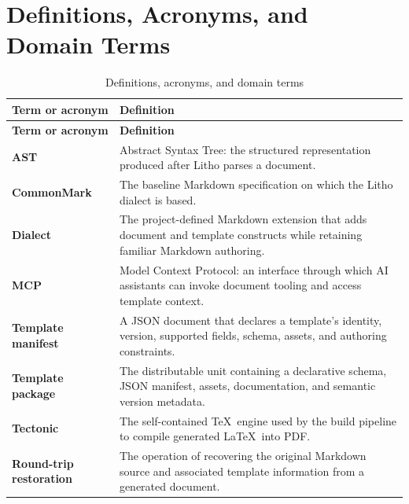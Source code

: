 
\chapter{Definitions, Acronyms, and Domain Terms}
\label{app:terms}

\begin{xltabular}{\textwidth}{@{}p{0.25\textwidth}X@{}}
\caption{Definitions, acronyms, and domain terms}\label{tab:terms}\\
\toprule
\textbf{Term or acronym} & \textbf{Definition} \\
\midrule
\endfirsthead
\toprule
\textbf{Term or acronym} & \textbf{Definition} \\
\midrule
\endhead
\textbf{AST} & Abstract Syntax Tree: the structured representation produced after Litho parses a document. \\
\textbf{CommonMark} & The baseline Markdown specification on which the Litho dialect is based. \\
\textbf{Dialect} & The project-defined Markdown extension that adds document and template constructs while retaining familiar Markdown authoring. \\
\textbf{MCP} & Model Context Protocol: an interface through which AI assistants can invoke document tooling and access template context. \\
\textbf{Template manifest} & A JSON document that declares a template's identity, version, supported fields, schema, assets, and authoring constraints. \\
\textbf{Template package} & The distributable unit containing a declarative schema, JSON manifest, assets, documentation, and semantic version metadata. \\
\textbf{Tectonic} & The self-contained \TeX\ engine used by the build pipeline to compile generated \LaTeX\ into PDF. \\
\textbf{Round-trip restoration} & The operation of recovering the original Markdown source and associated template information from a generated document. \\
\bottomrule
\end{xltabular}
